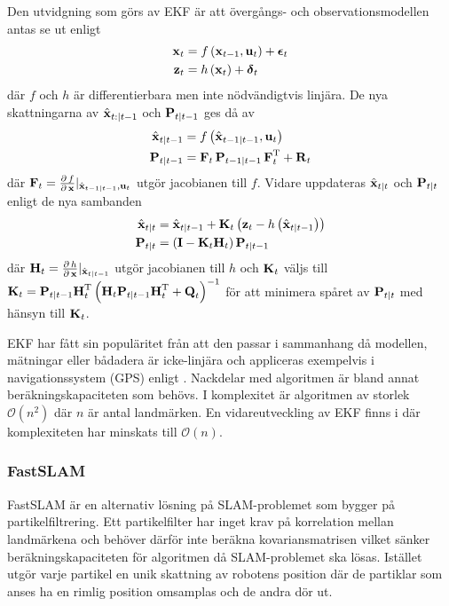 \documentclass[11pt]{article}
\newcommand{\bfr}[1]{\textbf{\textrm{{#1}}}}
\begin{document}
\begin{flushleft}
Den utvidgning som görs av EKF är att övergångs- och observationsmodellen antas se ut enligt
\begin{align*}
	\bfr{x}_{t} &= f\left(\bfr{x}_{t-1}, \bfr{u}_{t}\right) + \boldsymbol{\epsilon}_{t} \\
	\bfr{z}_{t} &= h\left(\bfr{x}_{t}\right) + \boldsymbol{\delta}
_{t}
\end{align*}
där $f$ och $h$ är differentierbara men inte nödvändigtvis linjära. De nya skattningarna av $\hat{\bfr{x}}_{t:\vert t-1}$ och $\bfr{P}_{t\vert t-1}$ ges då av 
\begin{align*}
	\hat{\bfr{x}}_{t\vert t-1} &= f\left(\hat{\bfr{x}}_{t-1\vert t-1},\bfr{u}_{t}\right) \\
	\bfr{P}_{t\vert t-1} & = \bfr{F}_{t}\,\bfr{P}_{t-1\vert t-1}\,\bfr{F}_{t}^{\mathrm{T}} + \bfr{R}_t
\end{align*}
där $\bfr{F}_{t} = \frac{\partial\,f}{\partial\,\bfr{x}}\rvert_{\hat{\bfr{x}}_{t-1 \vert t-1}, \bfr{u}_{t}}$ utgör jacobianen till $f$. Vidare uppdateras $\hat{\bfr{x}}_{t\vert t}$ och $\bfr{P}_{t\vert t}$ enligt de nya sambanden
\begin{align*}
	\hat{\bfr{x}}_{t\vert t} &= \hat{\bfr{x}}_{t\vert t-1} + \bfr{K}_{t}\left(\bfr{z}_{t} - h\left(\hat{\bfr{x}}_{t\vert t-1}\right)\right) \\
	\bfr{P}_{t\vert t} &= \left(\bfr{I} - \bfr{K}_{t}\bfr{H}_{t}\right)\bfr{P}_{t\vert t-1}	
\end{align*}
där $\bfr{H}_{t} = \frac{\partial\,h}{\partial\,\bfr{x}}\rvert_{\hat{\bfr{x}}_{t\vert t-1}}$ utgör jacobianen till $h$ och $\bfr{K}_{t}$ väljs till $\bfr{K}_{t} = \bfr{P}_{t\vert t-1}\bfr{H}_{t}^{\mathrm{T}}\left(\bfr{H}_{t}\bfr{P}_{t\vert t-1}\bfr{H}_{t}^{\mathrm{T}} + \bfr{Q}_{t}\right)^{-1}$ för att minimera spåret av $\bfr{P}_{t\vert t}$ med hänsyn till $\bfr{K}_{t}$.

EKF har fått sin populäritet från att den passar i sammanhang då modellen, mätningar eller bådadera är icke-linjära och appliceras exempelvis i navigationssystem (GPS) enligt \cite{ekfINaction}. Nackdelar med algoritmen är bland annat beräkningskapaciteten som behövs. I komplexitet är algoritmen av storlek $\mathcal{O}\left(n^{2}\right)$ där $n$ är antal landmärken. En vidareutveckling av EKF finns i \cite{ordo} där komplexiteten har minskats till $\mathcal{O}\left(n\right)$.

\subsubsection{FastSLAM}
FastSLAM är en alternativ lösning på SLAM-problemet som bygger på partikelfiltrering. Ett partikelfilter har inget krav på korrelation mellan landmärkena och behöver därför inte beräkna kovariansmatrisen vilket sänker beräkningskapaciteten för algoritmen då SLAM-problemet ska lösas. Istället utgör varje partikel en unik skattning av robotens position där de partiklar som anses ha en rimlig position omsamplas och de andra dör ut.


\end{flushleft}
\end{document}
